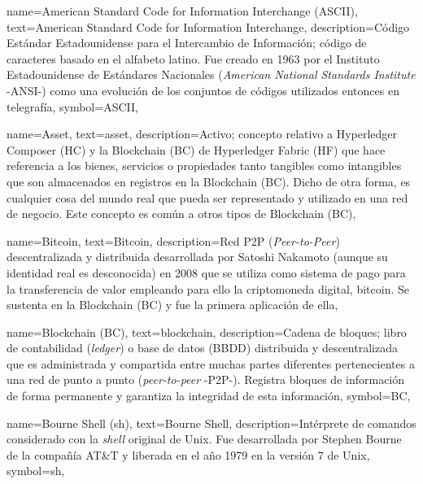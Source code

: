{
    name={American Standard Code for Information Interchange (ASCII)},
    text={American Standard Code for Information Interchange},
    description={Código Estándar Estadounidense para el Intercambio de Información; código de caracteres basado en el alfabeto latino. Fue creado en 1963 por el Instituto Estadounidense de Estándares Nacionales (\textit{American National Standards Institute} -ANSI-) como una evolución de los conjuntos de códigos utilizados entonces en telegrafía},
    symbol={ASCII},
}

{
    name={Asset},
    text={asset},
    description={Activo; concepto relativo a Hyperledger Composer (HC) y la Blockchain (BC) de Hyperledger Fabric (HF) que hace referencia a los bienes, servicios o propiedades tanto tangibles como intangibles que son almacenados en registros en la Blockchain (BC). Dicho de otra forma, es cualquier cosa del mundo real que pueda ser representado y utilizado en una red de negocio. Este concepto es común a otros tipos de Blockchain (BC)},
}

{
    name={Bitcoin},
    text={Bitcoin},
    description={Red P2P (\textit{Peer-to-Peer}) descentralizada y distribuida desarrollada por Satoshi Nakamoto (aunque su identidad real es desconocida) en 2008 que se utiliza como sistema de pago para la transferencia de valor empleando para ello la criptomoneda digital, bitcoin. Se sustenta en la Blockchain (BC) y fue la primera aplicación de ella},
}
	
{
    name={Blockchain (BC)},
    text={blockchain},
    description={Cadena de bloques; libro de contabilidad (\textit{ledger}) o base de datos (BBDD) distribuida y descentralizada que es administrada y compartida entre muchas partes diferentes pertenecientes a una red de punto a punto (\textit{peer-to-peer} -P2P-). Registra bloques de información de forma permanente y garantiza la integridad de esta información},
    symbol={BC},
}
	
{
    name={Bourne Shell (sh)},
    text={Bourne Shell},
    description={Intérprete de comandos considerado con la \textit{shell} original de Unix. Fue desarrollada por Stephen Bourne de la compañía AT\&T y liberada en el año 1979 en la versión 7 de Unix},
    symbol={sh},
}	

